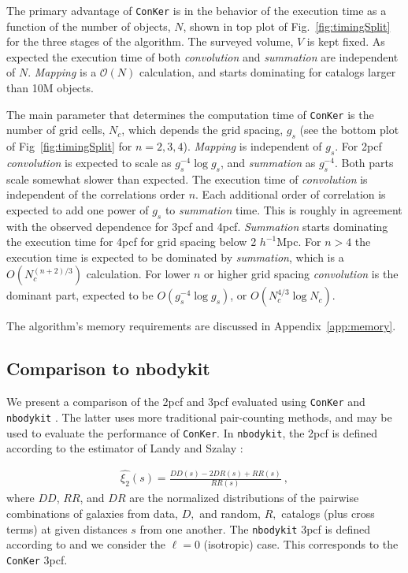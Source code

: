 \documentclass{aa}
\begin{document}
The primary advantage of {\tt ConKer} is in the behavior of the execution time as a function of the number of objects, $N$, shown in top plot of Fig.~\ref{fig:timingSplit} for the three stages of the algorithm. The  surveyed volume, $V$ is kept fixed. As expected the execution time of both \textit {convolution} and \textit {summation} are independent of $N$. \textit {Mapping} is a $\mathcal{O}(N)$ calculation, and starts dominating for catalogs larger than 10M objects. 

The main parameter that determines the computation time of {\tt ConKer} is the number of grid cells, $N_c$, which depends the grid spacing, $g_s$ (see the bottom plot of Fig~\ref{fig:timingSplit} for $n=2,3,4$).  \textit {Mapping} is independent of $g_s$. For 2pcf \textit {convolution}  is expected to scale as $g_s^{-4} \log g_s$, and \textit {summation} as $g_s^{-4}$. Both parts scale somewhat slower than expected. The execution time of \textit {convolution} is independent of the correlations order $n$. Each additional order of correlation is expected to add one power of $g_s$ to \textit {summation} time. This is roughly in agreement with the observed dependence for 3pcf and 4pcf. \textit {Summation} starts dominating the execution time for 4pcf for grid spacing below 2 $h^{-1}$Mpc. For  $n>4$ the execution time is expected to be dominated by \textit {summation}, which is a $O(N_c^{(n+2)/3})$ calculation. For lower $n$ or higher grid spacing \textit {convolution} is the dominant part,  expected to be $O(g_s^{-4}\log g_s )$, or $O(N_c^{4/3} \log N_c)$. 
 
The algorithm's memory requirements are discussed in Appendix~\ref{app:memory}.

\subsection{Comparison to nbodykit}

We present a comparison of the 2pcf and 3pcf evaluated using {\tt ConKer} and {\tt nbodykit} \citep{nbodykit}. The latter uses more traditional pair-counting methods, and may be used to evaluate the performance of {\tt ConKer}. In {\tt nbodykit}, the 2pcf is defined according to the estimator of Landy and Szalay \citep{Landy:1993yu,Hamilton:1993fp}:

\begin{align}
\hat{\xi_2}(s) = \frac{DD(s) - 2DR(s) + RR(s)}{RR(s)} \ ,
\label{eq:2pcfdef}
\end{align}
%
where $DD$, $RR$, and $DR$ are the normalized distributions of the pairwise combinations of galaxies from data, $D,$ and random, $R,$ catalogs (plus cross terms) at given distances $s$ from one another. The {\tt nbodykit} 3pcf is defined according to \cite{Slepian:2015qza} and we consider the $\ell = 0$ (isotropic) case. This corresponds to the {\tt ConKer} 3pcf.
\end{document}

